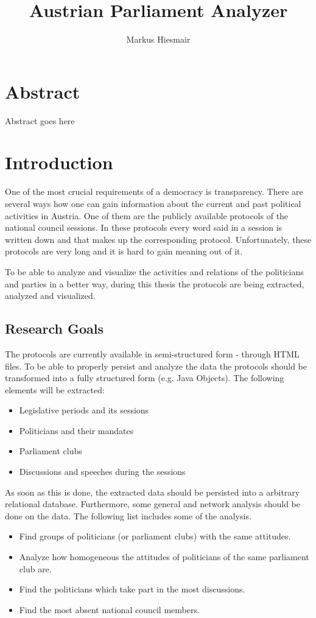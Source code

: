 \documentclass[12pt]{report}
\title{Austrian Parliament Analyzer}
\author{Markus Hiesmair}
\begin{document}
\maketitle
\newpage

\chapter*{Abstract}
Abstract goes here

\tableofcontents


\chapter{Introduction}
One of the most crucial requirements of a democracy is transparency. There are several ways how one can gain information about the current and past political activities in Austria. One of them are the publicly available protocols of the national council sessions. In these protocols every word said in a session is written down and that makes up the corresponding protocol. Unfortunately, these protocols are very long and it is hard to gain meaning out of it.

To be able to analyze and visualize the activities and relations of the politicians and parties in a better way, during this thesis the protocols are being extracted, analyzed and visualized. 

\section{Research Goals}
The protocols are currently available in semi-structured form - through HTML files. To be able to properly persist and analyze the data the protocols should be transformed into a fully structured form (e.g. Java Objects). The following elements will be extracted:
\begin{itemize}
  \item Legislative periods and its sessions
  \item Politicians and their mandates
  \item Parliament clubs
  \item Discussions and speeches during the sessions
\end{itemize}

As soon as this is done, the extracted data should be persisted into a arbitrary relational database. Furthermore, some general and network analysis should be done on the data. The following list includes some of the analysis.
\begin{itemize}
  \item Find groups of politicians (or parliament clubs) with the same attitudes.
  \item Analyze how homogeneous the attitudes of politicians of the same parliament club are.
  \item Find the politicians which take part in the most discussions.
  \item Find the most absent national council members.
\end{itemize}
\end{document}
